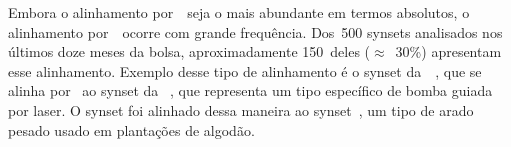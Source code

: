 Embora o alinhamento por~\eqsyn\ seja o mais abundante em termos absolutos, o
alinhamento por~\eqhypo\ ocorre com grande frequência. Dos~500 synsets
analisados nos últimos doze meses da bolsa, aproximadamente 150~deles
($\approx$~30\%) apresentam esse alinhamento. Exemplo desse tipo de alinhamento
é o synset da~\wnbr\ , que se
alinha por \eqhypo\ ao synset da \wnpr\ , que representa um tipo específico de bomba guiada por laser.
O synset  foi alinhado dessa maneira ao synset~, um tipo de arado pesado usado em plantações de algodão.
